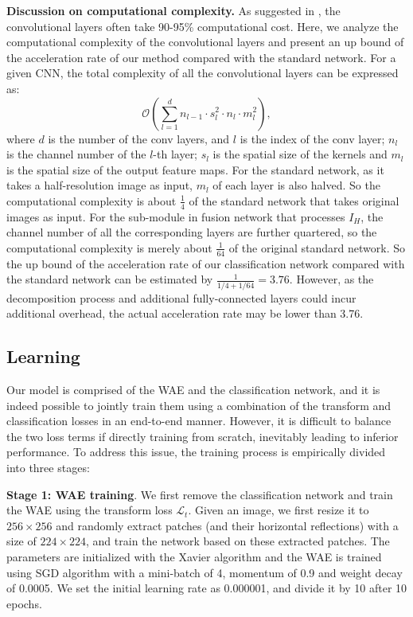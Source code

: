 \documentclass[letterpaper]{article} %
\begin{document}
\noindent\textbf{Discussion on computational complexity. } As suggested in \cite{he2015convolutional}, the convolutional layers often take 90-95\% computational cost. Here, we analyze the computational complexity of the convolutional layers and present an up bound of the acceleration rate of our method compared with the standard network. For a given CNN, the total complexity of all the convolutional layers can be expressed as:
\begin{equation}
\mathcal{O}(\sum_{l=1}^{d}n_{l-1} \cdot s_l^2 \cdot n_l \cdot m_l^2),
\end{equation}
where $d$ is the number of the conv layers, and $l$ is the index of the conv layer; $n_l$ is the channel number of the $l$-th layer; $s_l$ is the spatial size of the kernels and $m_l$ is the spatial size of the output feature maps. For the standard network, as it takes a half-resolution image as input, $m_l$ of each layer is also halved. So the computational complexity is about $\frac{1}{4}$ of the standard network that takes original images as input. For the sub-module in fusion network that processes $I_H$, the channel number of all the corresponding layers are further quartered, so the computational complexity is merely about $\frac{1}{64}$ of the original standard network. So the up bound of the acceleration rate of our classification network compared with the standard network can be estimated by $\frac{1} {1/4 + 1/64}=3.76$. However, as the decomposition process and additional fully-connected layers could incur additional overhead, the actual acceleration rate may be lower than 3.76.

\subsection{Learning}
Our model is comprised of the WAE and the classification network, and it is indeed possible to jointly train them using a combination of the transform and classification losses in an end-to-end manner. However, it is difficult to balance the two loss terms if directly training from scratch, inevitably leading to inferior performance. To address this issue, the training process is empirically divided into three stages:

\noindent\textbf{Stage 1: WAE training}. We first remove the classification network and train the WAE using the transform loss $\mathcal{L}_t$. Given an image, we first resize it to $256 \times 256$ and randomly extract patches (and their horizontal reflections) with a size of $224 \times 224$, and train the network based on these extracted patches. The parameters are  initialized with the Xavier algorithm \cite{glorot2010understanding} and the WAE is trained using SGD algorithm with a mini-batch of 4, momentum of 0.9 and weight decay of 0.0005. We set the initial learning rate as 0.000001, and divide it by 10 after 10 epochs.
\end{document}
